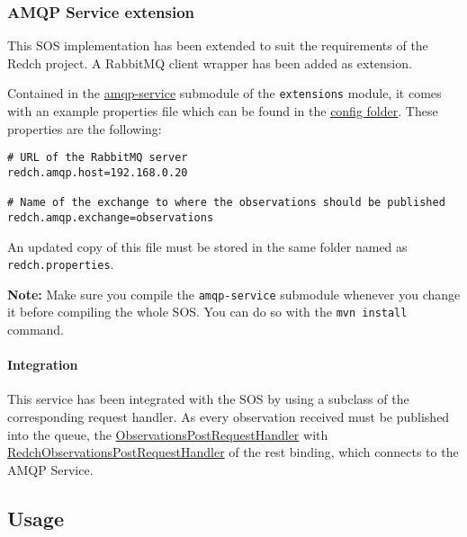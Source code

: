 \subsubsection*{AMQP Service extension}\label{amqp-service-extension}

This SOS implementation has been extended to suit the requirements of
the Redch project. A RabbitMQ client wrapper has been added as
extension.

Contained in the
\href{https://github.com/sauloperez/sos/tree/master/src/extensions/amqp-service}{amqp-service}
submodule of the \texttt{extensions} module, it comes with an example
properties file which can be found in the
\href{https://github.com/sauloperez/sos/tree/master/config}{config
folder}. These properties are the following:

\begin{verbatim}
# URL of the RabbitMQ server
redch.amqp.host=192.168.0.20

# Name of the exchange to where the observations should be published
redch.amqp.exchange=observations
\end{verbatim}

An updated copy of this file must be stored in the same folder named as
\texttt{redch.properties}.

\textbf{Note:} Make sure you compile the \texttt{amqp-service} submodule
whenever you change it before compiling the whole SOS. You can do so
with the \texttt{mvn install} command.

\paragraph{Integration}\label{integration}

This service has been integrated with the SOS by using a subclass of the
corresponding request handler. As every observation received must be
published into the queue, the
\href{https://github.com/sauloperez/sos/blob/master/src/bindings/rest/code/src/main/java/org/n52/sos/binding/rest/resources/observations/ObservationsPostRequestHandler.java}{ObservationsPostRequestHandler}
with
\href{https://github.com/sauloperez/sos/blob/mastero/src/bindings/rest/code/src/main/java/org/n52/sos/binding/rest/resources/observations/RedchObservationsPostRequestHandler.java}{RedchObservationsPostRequestHandler}
of the rest binding, which connects to the AMQP Service.

\subsection*{Usage}\label{usage}

